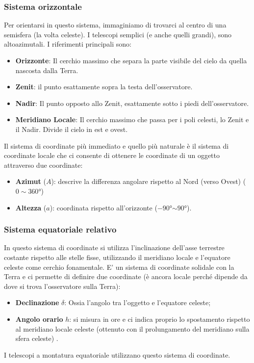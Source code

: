 \documentclass[a4paper, oneside]{book}
\begin{document}
\subsubsection{Sistema orizzontale}
Per orientarsi in questo sistema, immaginiamo di trovarci al centro di una semisfera (la volta celeste). 
I telescopi semplici (e anche quelli grandi), sono altoazimutali. I riferimenti principali sono:
\begin{itemize}
    \item \textbf{Orizzonte}: Il cerchio massimo che separa la parte visibile del cielo da quella nascosta dalla Terra.
    \item \textbf{Zenit}: il punto esattamente sopra la testa dell'osservatore.
    \item \textbf{Nadir}: Il punto opposto allo Zenit, esattamente sotto i piedi dell'osservatore.
    \item \textbf{Meridiano Locale}: Il cerchio massimo che passa per i poli celesti, lo Zenit e il Nadir. Divide il cielo in est e ovest.
\end{itemize}
Il sistema di coordinate più immediato e quello più naturale è il sistema di coordinate locale
che ci consente di ottenere le coordinate di un oggetto attraverso due coordinate:
\begin{itemize}
    \item \textbf{Azimut} ($A$): descrive la differenza angolare rispetto al Nord (verso Ovest) ($0 \sim 360$°)
    \item \textbf{Altezza} ($a$): coordinata rispetto all'orizzonte ($-90$°$\sim 90$°).
\end{itemize}

\subsubsection{Sistema equatoriale relativo}
In questo sistema di coordinate si utilizza l'inclinazione dell'asse terrestre costante rispetto alle
stelle fisse, utilizzando il meridiano locale e l'equatore celeste come cerchio fonamentale. E' un sistema di coordinate
solidale con la Terra e ci permette di definire due coordinate (è ancora locale perché dipende da dove
si trova l'osservatore sulla Terra):
\begin{itemize}
    \item \textbf{Declinazione} $\delta$: Ossia l'angolo tra l'oggetto e l'equatore celeste;
    \item \textbf{Angolo orario} $h$: si misura in ore e ci indica proprio lo spostamento rispetto al
     meridiano  locale celeste (ottenuto con il prolungamento del meridiano sulla sfera celeste) .
\end{itemize}
I telescopi a montatura equatoriale utilizzano questo sistema di coordinate.
\end{document}
